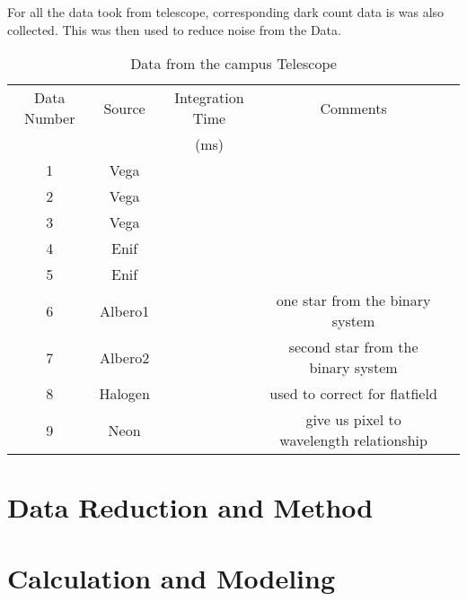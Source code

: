 \documentclass[a4paper,12pt]{article}
\begin{document}
For all the data took from telescope, corresponding dark count data is was also collected. This was then used to reduce noise from the Data.
\begin{table}[H]
\centering %
\caption{Data from the campus Telescope}
\footnotesize

\begin{tabular}{ccccc}%
\hline
\hline

Data Number & Source & Integration Time & Comments \\
& & (ms) &\\

 
\hline
\hline
1   &   Vega    &   & \\
2   &   Vega    &   & \\
3   &   Vega    &   & \\
4   &   Enif    &   &\\
5   &   Enif    &       &\\
6   &   Albero1 &       & one star from the binary system\\   
7   &   Albero2 &       & second star from the binary system\\
8   &   Halogen &       & used to correct for flatfield \\
9   &   Neon    &       & give us pixel to wavelength relationship\\


\hline
\hline

\end{tabular}
\label{table:telescope} %
\end{table}

\section{Data Reduction and Method}
\label{sec:reduction}

\section{Calculation and Modeling}
\label{sec:calc}

\end{document}
